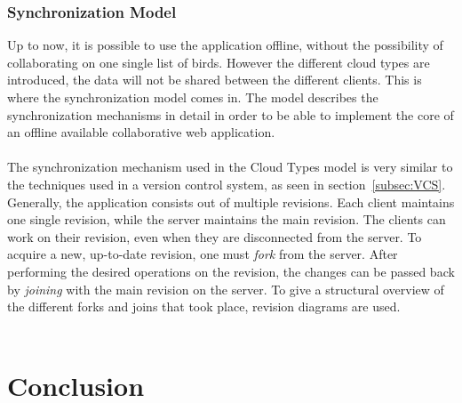 \documentclass[a4paper,12pt]{report}
\begin{document}
\subsection{Synchronization Model}\label{subsec:SynchronizationModel}

Up to now, it is possible to use the application offline, without the possibility of collaborating on one single list of birds. However the different cloud types are introduced, the data will not be shared between the different clients. This is where the synchronization model comes in. The model describes the synchronization mechanisms in detail in order to be able to implement the core of an offline available collaborative web application.\\
\\
The synchronization mechanism used in the Cloud Types model is very similar to the techniques used in a version control system, as seen in section~\ref{subsec:VCS}. Generally, the application consists out of multiple revisions. Each client maintains one single revision, while the server maintains the main revision. The clients can work on their revision, even when they are disconnected from the server. To acquire a new, up-to-date revision, one must \textit{fork} from the server. After performing the desired operations on the revision, the changes can be passed back by \textit{joining} with the main revision on the server. To give a structural overview of the different forks and joins that took place, revision diagrams are used. \\
\\


\chapter{Conclusion}\label{cha:Conclusion} %
\end{document}
